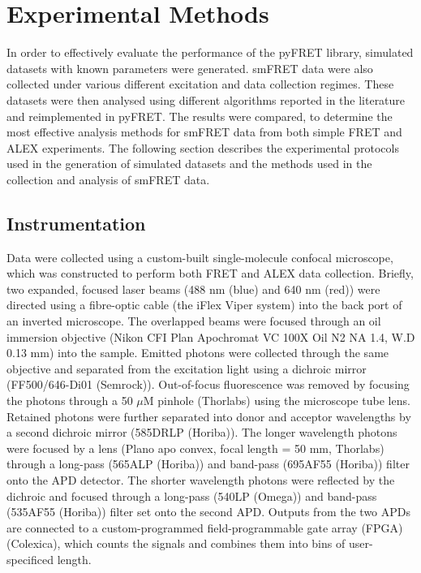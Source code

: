 \section{Experimental Methods}
In order to effectively evaluate the performance of the pyFRET library, simulated datasets with known parameters were generated. smFRET data were also collected under various different excitation and data collection regimes. These datasets were then analysed using different algorithms reported in the literature and reimplemented in pyFRET. The results were compared, to determine the most effective analysis methods for smFRET data from both simple FRET and ALEX experiments. The following section describes the experimental protocols used in the generation of simulated datasets and the methods used in the collection and analysis of smFRET data.

\subsection{Instrumentation}
\label{sect:instrumentation}
Data were collected using a custom-built single-molecule confocal microscope, which was constructed to perform both FRET and ALEX data collection. Briefly, two expanded, focused laser beams (488 nm (blue) and 640 nm (red)) were directed using a fibre-optic cable (the iFlex Viper system) into the back port of an inverted microscope. The overlapped beams were focused through an oil immersion objective (Nikon CFI Plan Apochromat VC 100X Oil N2 NA 1.4, W.D 0.13 mm) into the sample. Emitted photons were collected through the same objective and separated from the excitation light using a dichroic mirror (FF500/646-Di01 (Semrock)). Out-of-focus fluorescence was removed by focusing the photons through a 50 $\mu$M pinhole (Thorlabs) using the microscope tube lens. Retained photons were further separated into donor and acceptor wavelengths by a second dichroic mirror (585DRLP (Horiba)). The longer wavelength photons were focused by a lens (Plano apo convex, focal length = 50 mm, Thorlabs) through a long-pass (565ALP (Horiba)) and band-pass (695AF55 (Horiba)) filter onto the APD detector. The shorter wavelength photons were reflected by the dichroic and focused through a long-pass (540LP (Omega)) and band-pass (535AF55 (Horiba)) filter set onto the second APD. Outputs from the two APDs are connected to a custom-programmed field-programmable gate array (FPGA) (Colexica), which counts the signals and combines them into bins of user-specificed length. 

